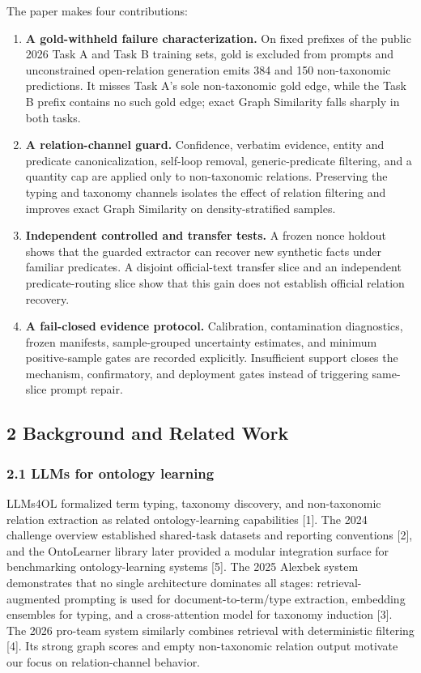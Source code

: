 \documentclass[
]{article}
\begin{document}
The paper makes four contributions:

\begin{enumerate}
\def\labelenumi{\arabic{enumi}.}
\item
  \textbf{A gold-withheld failure characterization.} On fixed prefixes
  of the public 2026 Task A and Task B training sets, gold is excluded
  from prompts and unconstrained open-relation generation emits 384 and
  150 non-taxonomic predictions. It misses Task A's sole non-taxonomic
  gold edge, while the Task B prefix contains no such gold edge; exact
  Graph Similarity falls sharply in both tasks.
\item
  \textbf{A relation-channel guard.} Confidence, verbatim evidence,
  entity and predicate canonicalization, self-loop removal,
  generic-predicate filtering, and a quantity cap are applied only to
  non-taxonomic relations. Preserving the typing and taxonomy channels
  isolates the effect of relation filtering and improves exact Graph
  Similarity on density-stratified samples.
\item
  \textbf{Independent controlled and transfer tests.} A frozen nonce
  holdout shows that the guarded extractor can recover new synthetic
  facts under familiar predicates. A disjoint official-text transfer
  slice and an independent predicate-routing slice show that this gain
  does not establish official relation recovery.
\item
  \textbf{A fail-closed evidence protocol.} Calibration, contamination
  diagnostics, frozen manifests, sample-grouped uncertainty estimates,
  and minimum positive-sample gates are recorded explicitly.
  Insufficient support closes the mechanism, confirmatory, and
  deployment gates instead of triggering same-slice prompt repair.
\end{enumerate}

\subsection{2 Background and Related
Work}\label{background-and-related-work}

\subsubsection{2.1 LLMs for ontology
learning}\label{llms-for-ontology-learning}

LLMs4OL formalized term typing, taxonomy discovery, and non-taxonomic
relation extraction as related ontology-learning capabilities {[}1{]}.
The 2024 challenge overview established shared-task datasets and
reporting conventions {[}2{]}, and the OntoLearner library later
provided a modular integration surface for benchmarking
ontology-learning systems {[}5{]}. The 2025 Alexbek system demonstrates
that no single architecture dominates all stages: retrieval-augmented
prompting is used for document-to-term/type extraction, embedding
ensembles for typing, and a cross-attention model for taxonomy induction
{[}3{]}. The 2026 pro-team system similarly combines retrieval with
deterministic filtering {[}4{]}. Its strong graph scores and empty
non-taxonomic relation output motivate our focus on relation-channel
behavior.
\end{document}
